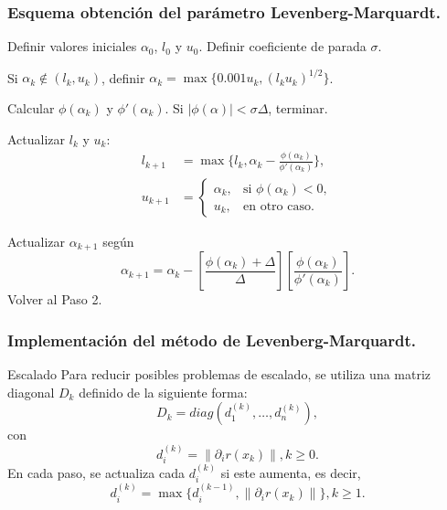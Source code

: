 \documentclass{beamer}
\newcommand{\norm}[1]{\left\lVert#1\right\rVert}
\begin{document}
\begin{frame}
    \frametitle{Esquema obtención del parámetro Levenberg-Marquardt.}
    \begin{steps}
        \item Definir valores iniciales $\alpha_0$, $l_0$ y $u_0$. Definir coeficiente de parada $\sigma$.
        \item Si $\alpha_k \notin (l_k, u_k)$, definir $\alpha_k = \max \{0.001u_k, (l_ku_k)^{1/2}\}$.	
        \item Calcular $\phi(\alpha_k)$ y $\phi'(\alpha_k)$. Si $|\phi(\alpha)|<\sigma\Delta$, terminar.
        \item Actualizar $l_k$ y $u_k$:
            \begin{align*}
                l_{k+1} &= \max \{l_k, \alpha_k-\frac{\phi(\alpha_k)}{\phi'(\alpha_k)}\}, \\
                u_{k+1} &= \begin{cases}
                    \alpha_k, & \text{si } \phi(\alpha_k) < 0, \\
                    u_k, & \text{en otro caso}.
                \end{cases}
            \end{align*}
        \item Actualizar $\alpha_{k+1}$ según
        \begin{equation*}
            \alpha_{k+1} = \alpha_k - \left[\frac{\phi(\alpha_k)+\Delta}{\Delta}\right]
                            \left[\frac{\phi(\alpha_k)}{\phi'(\alpha_k)}\right].
        \end{equation*}
        Volver al Paso 2.
    \end{steps}
\end{frame}

\begin{frame}
    \frametitle{Implementación del método de Levenberg-Marquardt.}
    \begin{block}{Escalado}
        Para reducir posibles problemas de escalado, se utiliza una matriz diagonal $D_k$ definido de la siguiente forma:
        \begin{equation*}
            D_k = diag(d_1^{(k)}, \ldots, d_n^{(k)}),
        \end{equation*}
        con
        \begin{equation*}
            d_i^{(k)}=\norm{\partial_ir(x_k)}, k\geq 0.
        \end{equation*}
        En cada paso, se actualiza cada $d_i^{(k)}$ si este aumenta, es decir,
        \begin{equation*}
            d_i^{(k)} = \max \{d_i^{(k-1)}, \norm{\partial_ir(x_k)}\}, k\geq 1.
        \end{equation*}
    \end{block}
\end{frame}
\end{document}
